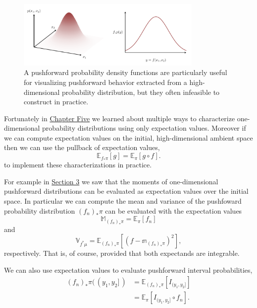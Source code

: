 \documentclass[
  letterpaper,
  DIV=11,
  numbers=noendperiod]{scrartcl}
\begin{document}
\begin{figure}

{\centering \includegraphics[width=0.8\textwidth,height=\textheight]{figures/pushforward_characterizations/density/density.pdf}

}

\caption{\label{fig-pushforward-characterizations-density}A pushforward
probability density functions are particularly useful for visualizing
pushforward behavior extracted from a high-dimensional probability
distribution, but they often infeasible to construct in practice.}

\end{figure}

Fortunately in
\href{https://betanalpha.github.io/assets/chapters_html/expectation_values.html}{Chapter
Five} we learned about multiple ways to characterize one-dimensional
probability distributions using only expectation values. Moreover if we
can compute expectation values on the initial, high-dimensional ambient
space then we can use the pullback of expectation values, \[
\mathbb{E}_{f_{*} \pi}[ g ] = \mathbb{E}_{\pi} [ g \circ f ].
\] to implement these characterizations in practice.

For example in \href{@sec:transforming-integrals}{Section 3} we saw that
the moments of one-dimensional pushforward distributions can be
evaluated as expectation values over the initial space. In particular we
can compute the mean and variance of the pushfoward probability
distribution \((f_{n})_{*} \pi\) can be evaluated with the expectation
values \[
\mathbb{M}_{(f_{n})_{*} \pi}
=
\mathbb{E}_{\pi} [ f_{n} ]
\] and \[
\mathbb{V}_{f^{*} \mu}
=
\mathbb{E}_{(f_{n})_{*} \pi} [ (f - \mathbb{m}_{(f_{n})_{*} \pi})^{2} ],
\] respectively. That is, of course, provided that both expectands are
integrable.

We can also use expectation values to evaluate pushforward interval
probabilities, \begin{align*}
(f_{n})_{*} \pi( \, (y_{1}, y_{2} ] \, )
&=
\mathbb{E}_{(f_{n})_{*} \pi} [ I_{(y_{1}, y_{2} ]} ]
\\
&=
\mathbb{E}_{\pi} [ I_{(y_{1}, y_{2} ]} \circ f_{n} ].
\end{align*}
\end{document}

